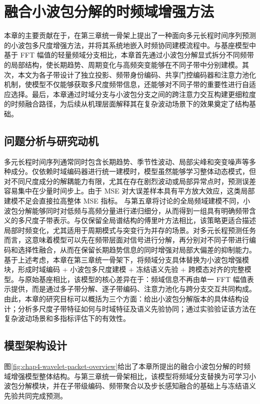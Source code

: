 ﻿\chapter{融合小波包分解的时频域增强方法} 本章的主要贡献在于，在第三章统一骨架上提出了一种面向多元长程时间序列预测的小波包多尺度增强方法，并将其系统地嵌入时频协同建模流程中。与基座模型中基于 FFT 幅值的轻量频域分支相比，本章首先通过小波包分解显式拆分不同频带的局部结构，使长期趋势、周期变化与高频突变能够在不同子带中分别建模。其次，本文为各子带设计了独立投影、频带身份编码、共享门控编码器和注意力池化机制，使模型不仅能够获取多尺度频带信息，还能够对不同子带的重要性进行自适应选择。最后，本章通过时域分支与小波包分支之间的跨注意力交互构建更细粒度的时频融合路径，为后续从机理层面解释其在复杂波动场景下的效果奠定了结构基础。 \section{问题分析与研究动机} 多元长程时间序列通常同时包含长期趋势、季节性波动、局部尖峰和突变噪声等多种成分。仅依赖时域编码器进行统一建模时，模型虽然能够学习整体动态模式，但对不同尺度成分的解耦能力有限，尤其在存在剧烈波动或局部异常点时，预测误差容易集中在少量时间步上。由于 MSE 对大误差样本具有平方放大效应，这类局部建模不足会直接拉高整体 MSE 指标。 与第五章将讨论的全局频域建模不同，小波包分解能够同时对低频与高频分量进行递归细分，从而得到一组具有明确频带含义的多尺度子带表示。与仅保留全局谱结构的傅里叶方法相比，该策略更适合描述局部时频变化，尤其适用于周期模式与突变行为并存的场景。对多元长程预测任务而言，这意味着模型可以先在频带层面对信号进行分解，再分别对不同子带进行编码和选择性融合，从而在保留长期趋势信息的同时增强对局部大偏差的抑制能力。 基于上述考虑，本章在第三章统一骨架下，将频域分支具体替换为小波包增强模块，形成时域编码 + 小波包多尺度建模 + 冻结语义先验 + 跨模态对齐的完整模型。与原始基座相比，该模型的核心差异在于：频域信息不再由单一 FFT 幅值表示提供，而是通过多子带分解、逐子带编码、注意力池化与跨分支交互共同构成。由此，本章的研究目标可以概括为三个方面：给出小波包分解版本的具体结构设计；分析多尺度子带特征如何与时域特征及语义先验协同；通过实验验证该方法在复杂波动场景和多指标评估下的有效性。 \section{模型架构设计} 图\ref{fig:chap4-wavelet-packet-overview}给出了本章所提出的融合小波包分解的时频域增强模型整体结构。与第三章统一骨架相比，该模型将频域分支替换为可学习小波包分解模块，并在子带级编码、频带聚合以及步长感知融合的基础上与冻结语义先验共同完成预测\cite{sweldens1997lifting}。 \begin{figure}[!ht]

\end{figure}
